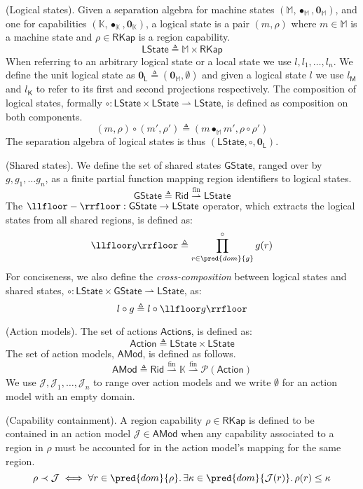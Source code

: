  (Logical states). Given a separation algebra for machine states $(\mathbb{M}, \bullet_\mathbb{M}, \mathbf{0}_\mathbb{M})$, and one for capabilities $(\mathbb{K}, \bullet_\mathbb{K}, \mathbf{0}_\mathbb{K})$, a logical state is a pair $(m, \rho)$ where $m \in \mathbb{M}$ is a machine state and $\rho \in \mathsf{RKap}$ is a region capability.
\[
	\mathsf{LState} \triangleq \mathbb{M} \times \mathsf{RKap}
\]
When referring to an arbitrary logical state or a local state we use $l, l_1, \ldots, l_n$. We define the unit logical state as $\mathbf{0}_\mathsf{L} \triangleq (\mathbf{0}_\mathbb{M}, \emptyset)$ and given a logical state $l$ we use $l_\mathsf{M}$ and $l_\mathsf{K}$ to refer to its first and second projections respectively. The composition of logical states, formally $\circ : \mathsf{LState} \times \mathsf{LState} \rightharpoonup \mathsf{LState}$, is defined as composition on both components.
\[
	(m, \rho) \circ (m', \rho') \triangleq (m \bullet_\mathbb{M} m', \rho \circ \rho')
\]
The separation algebra of logical states is thus $(\mathsf{LState}, \circ, \mathbf{0}_\mathsf{L})$.

 (Shared states). We define the set of shared states $\mathsf{GState}$, ranged over by $g, g_1, \ldots g_n$, as a finite partial function mapping region identifiers to logical states.
\[
	\mathsf{GState} \triangleq \mathsf{Rid} \overset{\text{fin}}{\rightharpoonup} \mathsf{LState}
\]
The $\llfloor - \rrfloor : \mathsf{GState} \rightarrow \mathsf{LState}$ operator, which extracts the logical states from all shared regions, is defined as:
\[
	\llfloor g \rrfloor \triangleq \prod^{\circ}_{r \in \pred{dom}{g}} g(r)
\]
For conciseness, we also define the \textit{cross-composition} between logical states and shared states, $\circ : \mathsf{LState} \times \mathsf{GState} \rightharpoonup \mathsf{LState}$, as:
\[
	l \circ g \triangleq l \circ \llfloor g \rrfloor
\]

 (Action models). The set of actions $\mathsf{Actions}$, is defined as:
\[
	\mathsf{Action} \triangleq \mathsf{LState} \times \mathsf{LState}
\]
The set of action models, $\mathsf{AMod}$, is defined as follows.
\[
	\mathsf{AMod} \triangleq \mathsf{Rid} \overset{\text{fin}}{\rightharpoonup} \mathbb{K} \overset{\text{fin}}{\rightharpoonup} \mathcal{P}(\mathsf{Action})
\]
We use $\mathcal{J}, \mathcal{J}_1, \ldots, \mathcal{J}_n$ to range over action models and we write $\emptyset$ for an action model with an empty domain.

 (Capability containment). A region capability $\rho \in \mathsf{RKap}$ is defined to be contained in an action model $\mathcal{J} \in \mathsf{AMod}$ when any capability associated to a region in $\rho$ must be accounted for in the action model's mapping for the same region.
\[
	\rho \prec \mathcal{J} \iff \forall r \in \pred{dom}{\rho} \ldotp \exists \kappa \in \pred{dom}{\mathcal{J}(r)} \ldotp \rho(r) \leq \kappa
\]

